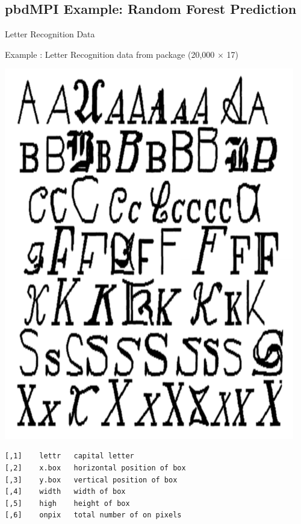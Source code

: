 \subsection{pbdMPI Example: Random Forest Prediction}
\makesubcontentsslidessec


\begin{frame}[fragile]{Letter Recognition Data}
  \begin{exampleblock}{Example \countex : Letter Recognition data from
      package  (20,000 $\times$ 17)}\pause
    \vspace{-1em}
    \begin{minipage}{0.3\textwidth}
      \includegraphics[width=0.95\textwidth]{../common/pics/apps/ML_FreySlate1991}
    \end{minipage}
    \begin{minipage}{0.69\textwidth}\tiny
      \begin{lstlisting}
[,1]	lettr	capital letter
[,2]	x.box	horizontal position of box
[,3]	y.box	vertical position of box
[,4]	width	width of box
[,5]	high	height of box
[,6]	onpix	total number of on pixels

\end{lstlisting}
\end{minipage}
\end{exampleblock}
\end{frame}
